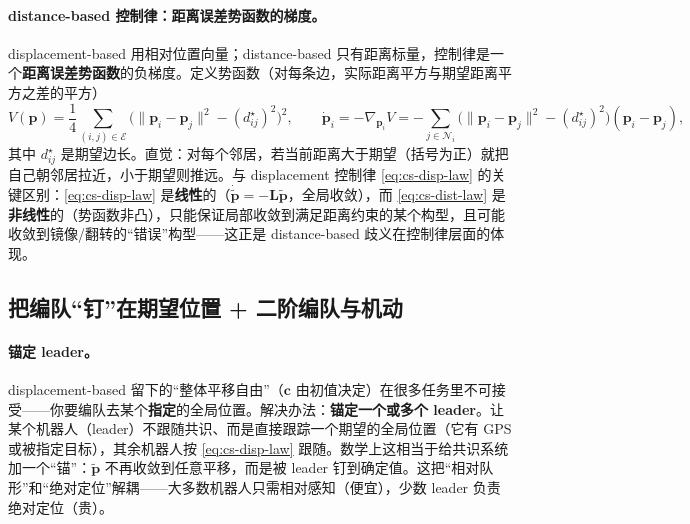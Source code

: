 \paragraph{distance-based 控制律：距离误差势函数的梯度。}
displacement-based 用相对位置向量；distance-based 只有距离标量，控制律是一个\textbf{距离误差势函数}的负梯度。定义势函数（对每条边，实际距离平方与期望距离平方之差的平方）
\begin{equation}
  V(\mathbf{p})=\frac14\sum_{(i,j)\in\mathcal{E}}\big(\|\mathbf{p}_i-\mathbf{p}_j\|^2-(d_{ij}^\star)^2\big)^2,\qquad
  \dot{\mathbf{p}}_i=-\nabla_{\mathbf{p}_i}V=-\sum_{j\in\mathcal{N}_i}\big(\|\mathbf{p}_i-\mathbf{p}_j\|^2-(d_{ij}^\star)^2\big)(\mathbf{p}_i-\mathbf{p}_j),
  \label{eq:cs-dist-law}
\end{equation}
其中 $d_{ij}^\star$ 是期望边长。直觉：对每个邻居，若当前距离大于期望（括号为正）就把自己朝邻居拉近，小于期望则推远。与 displacement 控制律 \cref{eq:cs-disp-law} 的关键区别：\cref{eq:cs-disp-law} 是\textbf{线性}的（$\dot{\tilde{\mathbf{p}}}=-\mathbf{L}\tilde{\mathbf{p}}$，全局收敛），而 \cref{eq:cs-dist-law} 是\textbf{非线性}的（势函数非凸），只能保证局部收敛到满足距离约束的某个构型，且可能收敛到镜像/翻转的“错误”构型——这正是 distance-based 歧义在控制律层面的体现。

\subsection{把编队“钉”在期望位置 + 二阶编队与机动}
\label{sec:cs-form-anchor}

\paragraph{锚定 leader。}
displacement-based 留下的“整体平移自由”（$\mathbf{c}$ 由初值决定）在很多任务里不可接受——你要编队去某个\textbf{指定}的全局位置。解决办法：\textbf{锚定一个或多个 leader}。让某个机器人（leader）不跟随共识、而是直接跟踪一个期望的全局位置（它有 GPS 或被指定目标），其余机器人按 \cref{eq:cs-disp-law} 跟随。数学上这相当于给共识系统加一个“锚”：$\tilde{\mathbf{p}}$ 不再收敛到任意平移，而是被 leader 钉到确定值。这把“相对队形”和“绝对定位”解耦——大多数机器人只需相对感知（便宜），少数 leader 负责绝对定位（贵）。

